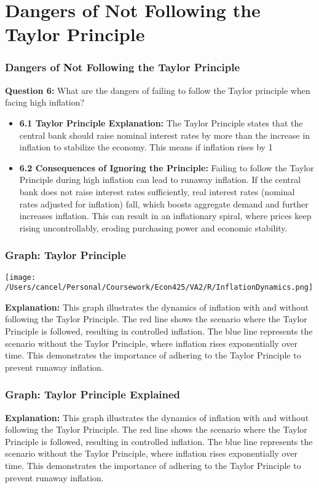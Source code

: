 \documentclass{beamer}
\begin{document}
\section{Dangers of Not Following the Taylor Principle}
\begin{frame}
    \frametitle{Dangers of Not Following the Taylor Principle}
    \textbf{Question 6:} What are the dangers of failing to follow the Taylor principle when facing high inflation?
    \begin{itemize}
        \item \textbf{6.1 Taylor Principle Explanation:} The Taylor Principle states that the central bank should raise nominal interest rates by more than the increase in inflation to stabilize the economy. This means if inflation rises by 1%
        \item \textbf{6.2 Consequences of Ignoring the Principle:} Failing to follow the Taylor Principle during high inflation can lead to runaway inflation. If the central bank does not raise interest rates sufficiently, real interest rates (nominal rates adjusted for inflation) fall, which boosts aggregate demand and further increases inflation. This can result in an inflationary spiral, where prices keep rising uncontrollably, eroding purchasing power and economic stability.
    \end{itemize}
\end{frame}

\begin{frame}
    \frametitle{Graph: Taylor Principle}
    \begin{center}
        \texttt{[image: /Users/cancel/Personal/Coursework/Econ425/VA2/R/InflationDynamics.png]}
    \end{center}
    \textbf{Explanation:} This graph illustrates the dynamics of inflation with and without following the Taylor Principle. The red line shows the scenario where the Taylor Principle is followed, resulting in controlled inflation. The blue line represents the scenario without the Taylor Principle, where inflation rises exponentially over time. This demonstrates the importance of adhering to the Taylor Principle to prevent runaway inflation.
\end{frame}

\begin{frame}
    \frametitle{Graph: Taylor Principle Explained}
    \textbf{Explanation:} This graph illustrates the dynamics of inflation with and without following the Taylor Principle. The red line shows the scenario where the Taylor Principle is followed, resulting in controlled inflation. The blue line represents the scenario without the Taylor Principle, where inflation rises exponentially over time. This demonstrates the importance of adhering to the Taylor Principle to prevent runaway inflation.

    

\end{frame}
\end{document}
